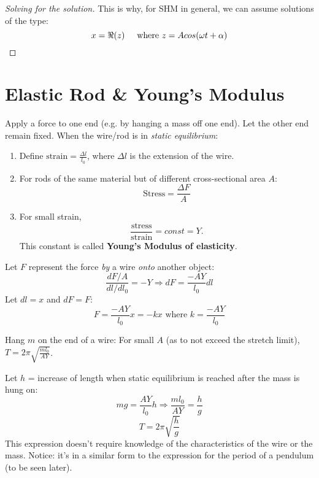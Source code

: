 \documentclass[11pt,letterpaper,titlepage,oneside]{book}
\begin{document}
\begin{proof}[Solving for the solution]
This is why, for SHM in general, we can assume solutions of the type:
\begin{equation}
	x=\Re(z) \hspace{0.5cm}\text{where }z=Acos(\omega t + \alpha)
\end{equation}
\end{proof}


\section{Elastic Rod \& Young's Modulus}

Apply a force to one end (e.g. by hanging a mass off one end). Let the other end remain fixed. When the wire/rod is in \textit{static equilibrium}:
\begin{enumerate}
\item Define $\boxed{\text{strain} = \frac{\Delta l}{l_0}}$, where $\Delta l$ is the extension of the wire. 

\item For rods of the same material but of different cross-sectional area $A$: \\
\[\boxed{ \text{Stress} = \frac{\Delta F}{A}} \]

\item For small strain, \[\boxed{ \frac{\text{stress}}{\text{strain}}=const=Y }.\]
This constant is called \textbf{Young's Modulus of elasticity}.
\end{enumerate}

Let $F$ represent the force \textit{by} a wire \textit{onto} another object:
\begin{equation} \frac{dF/A}{dl/dl_0} = -Y \Longrightarrow dF = \frac{-AY}{l_0}dl \label{youngs_dF} \end{equation}
Let $dl = x$ and $dF=F$: \begin{equation} \boxed{F=\frac{-AY}{l_0}x=-kx} \text{ where } k=\frac{-AY}{l_0} \label{youngs_F} \end{equation}


Hang $m$ on the end of a wire:
For small $A$ (as to not exceed the stretch limit), $T=2\pi\sqrt{\frac{ml_0}{AY}}$.

Let $h$ = increase of length when static equilibrium is reached after the mass is hung on:
\[ mg=\frac{AY}{l_0}h \Longrightarrow \frac{ml_0}{AY}=\frac{h}{g} \]
\begin{equation}
T=2\pi\sqrt{\frac{h}{g}} \label{elWireT}
\end{equation} 
This expression doesn't require knowledge of the characteristics of the wire or the mass.
Notice: it's in a similar form to the expression for the period of a pendulum (to be seen later).
\end{document}
